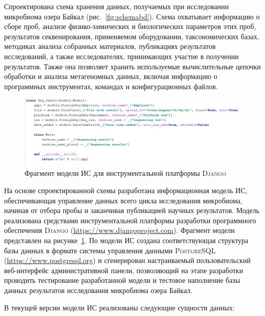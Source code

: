 \documentclass[a4paper,12pt,openany,final]{extreport}
\def\oldcaption{} \let\oldcaption=\caption
\def\caption{\stepcounter{captionsnum}\oldcaption}
\begin{document}
Спроектирована схема хранения данных, получаемых при исследовании
микробиома озера Байкал (рис.~\ref{fig:schemabd}). Схема охватывает информацию о сборе
проб, анализе физико-химических и биологических параметров этих проб,
результатов секвенирования, применяемом оборудовании, таксономических
базах, методиках анализа собранных материалов, публикациях результатов
исследований, а также исследователях, принимающих участие в получении
результатов. Также она позволяет хранить используемые вычислительные
цепочки обработки и анализа метагеномных данных, включая информацию о
программных инструментах, командах и конфигурационных файлов.

\begin{figure}\centering
\includegraphics[width=0.9\linewidth]{media/image16.png}

\caption{Фрагмент модели ИС для инструментальной платформы \textsc{Django}}\label{fig:instrmod}

\end{figure}

На основе спроектированной схемы разработана информационная модель ИС,
обеспечивающая управление данных всего цикла исследования микробиома,
начиная от отбора пробы и заканчивая публикацией научных результатов.
Модель реализована средствами инструментальной платформы разработки
программного обеспечения \textsc{Django}
(\href{https://www.djangoproject.com}{{https://www.djangoproject.com}}).
Фрагмент модели представлен на рисунке~\ref{fig:instrmod}. По модели ИС создана
соответствующая структура базы данных в формате системы управления
данными \textsc{PostgreSQL}
(\href{https://www.postgresql.org}{{https://www.postgresql.org}}) и
сгенерирован настраиваемый пользовательский веб-интерфейс
административной панели, позволяющий на этапе разработки проводить
тестирование разработанной модели и тестовое наполнение базы данных
результатов исследования микробиома озера Байкал.

В текущей версии модели ИС реализованы следующие сущности данных:
\end{document}
